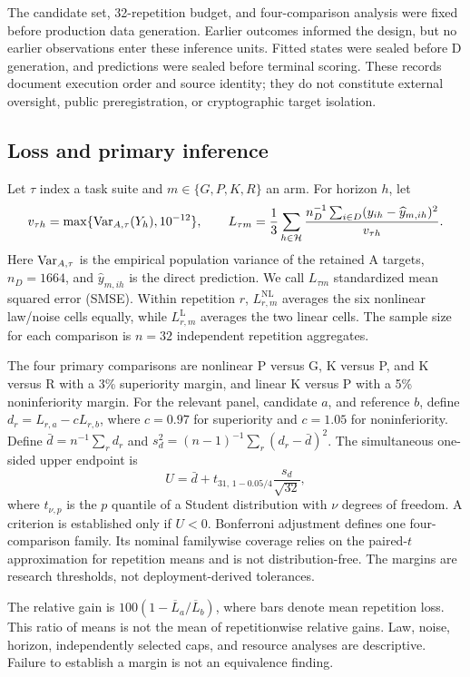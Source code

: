 The candidate set, 32-repetition budget, and four-comparison analysis were fixed before production data generation. Earlier outcomes informed the design, but no earlier observations enter these inference units. Fitted states were sealed before D generation, and predictions were sealed before terminal scoring. These records document execution order and source identity; they do not constitute external oversight, public preregistration, or cryptographic target isolation.

\subsection{Loss and primary inference}
Let $\tau$ index a task suite and $m\in\{G,P,K,R\}$ an arm. For horizon $h$, let
\[
 v_{\tau h}=\max\{\operatorname{Var}_{A,\tau}(Y_h),10^{-12}\},\qquad
 L_{\tau m}=\frac13\sum_{h\in\mathcal H}\frac{n_D^{-1}\sum_{i\in D}(y_{ih}-\widehat y_{m,ih})^2}{v_{\tau h}}.
\]
Here $\operatorname{Var}_{A,\tau}$ is the empirical population variance of the retained A targets, $n_D=1664$, and $\widehat y_{m,ih}$ is the direct prediction. We call $L_{\tau m}$ standardized mean squared error (SMSE). Within repetition $r$, $L^{\mathrm{NL}}_{r,m}$ averages the six nonlinear law/noise cells equally, while $L^{\mathrm L}_{r,m}$ averages the two linear cells. The sample size for each comparison is $n=32$ independent repetition aggregates.

The four primary comparisons are nonlinear P versus G, K versus P, and K versus R with a 3\% superiority margin, and linear K versus P with a 5\% noninferiority margin. For the relevant panel, candidate $a$, and reference $b$, define $d_r=L_{r,a}-cL_{r,b}$, where $c=0.97$ for superiority and $c=1.05$ for noninferiority. Define $\bar d=n^{-1}\sum_r d_r$ and $s_d^2=(n-1)^{-1}\sum_r(d_r-\bar d)^2$. The simultaneous one-sided upper endpoint is
\begin{equation}
 U=\bar d+t_{31,\,1-0.05/4}\frac{s_d}{\sqrt{32}},
 \label{eq:inference}
\end{equation}
where $t_{\nu,p}$ is the $p$ quantile of a Student distribution with $\nu$ degrees of freedom. A criterion is established only if $U<0$. Bonferroni adjustment defines one four-comparison family. Its nominal familywise coverage relies on the paired-$t$ approximation for repetition means and is not distribution-free. The margins are research thresholds, not deployment-derived tolerances.

The relative gain is $100(1-\overline L_a/\overline L_b)$, where bars denote mean repetition loss. This ratio of means is not the mean of repetitionwise relative gains. Law, noise, horizon, independently selected caps, and resource analyses are descriptive. Failure to establish a margin is not an equivalence finding.

